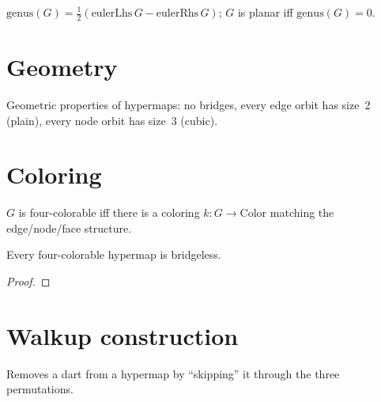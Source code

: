 \begin{definition}
  \label{def:Planar}
  \leanok
  $\mathrm{genus}(G) = \tfrac{1}{2}(\mathrm{eulerLhs}\,G - \mathrm{eulerRhs}\,G)$;
  $G$ is planar iff $\mathrm{genus}(G) = 0$.
\end{definition}

\chapter{Geometry}


\begin{definition}
  \label{def:Geometry}
  \leanok
  Geometric properties of hypermaps: no bridges, every edge orbit has size~2
  (plain), every node orbit has size~3 (cubic).
\end{definition}

\chapter{Coloring}


\begin{definition}
  \label{def:FourColorable}
  \leanok
  $G$ is four-colorable iff there is a coloring $k : G \to \mathrm{Color}$
  matching the edge/node/face structure.
\end{definition}

\begin{theorem}
  \label{thm:four-colorable-bridgeless}
  \leanok
  Every four-colorable hypermap is bridgeless.
\end{theorem}
\begin{proof}\leanok\end{proof}

\chapter{Walkup construction}


\begin{definition}
  \label{def:walkupE}
  \leanok
  Removes a dart from a hypermap by ``skipping'' it through the three
  permutations.
\end{definition}


